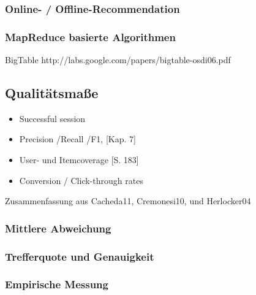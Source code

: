 \subsubsection{Online- / Offline-Recommendation}
\subsubsection{MapReduce basierte Algorithmen}
\citep{mapred008}
\citep{jiang11}


BigTable http://labs.google.com/papers/bigtable-osdi06.pdf 

\subsection{Qualitätsmaße}\label{sec:measures}

	\begin{itemize}
	\item Successful session \citep{hb_18,Smyth05alive-user}
	\item Precision /Recall /F1, \citep{rs}[Kap. 7]
	\item User- und Itemcoverage \citep{rs}[S. 183]
	\item Conversion / Click-through rates
	\end{itemize}

Zusammenfassung aus Cacheda11, Cremonesi10, und Herlocker04

\subsubsection*{Mittlere Abweichung}\newpage
\subsubsection*{Trefferquote und Genauigkeit}\newpage
\subsubsection*{Empirische Messung}\newpage

\newpage

